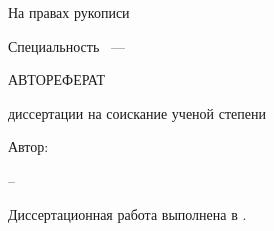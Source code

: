 
%
%
%
%

\thispagestyle{empty}

\begin{center}
	\dissorg
	\par
\end{center}

\begin{flushright}
На правах рукописи

\end{flushright}

\vspace{30mm}
\begin{center}
{\bf \large \dissauthor}
\end{center}

\vspace{5mm}
\begin{center}
{\bf \large \disstitle
\par}

\vspace{10mm}
{%
Специальность \specnum~---

\specname
}

\vspace{10mm}
\MakeUppercase{Автореферат}

диссертации на соискание ученой степени

\edudegree
\end{center}

\vspace{10mm}
Автор:

\vfill
\begin{center}
{\disscity -- \dissyear}
\end{center}



\newpage
\thispagestyle{empty}
\noindent Диссертационная работа выполнена в \dissorgsyn.

